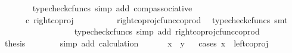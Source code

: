 \begin{isabellebody}
\ \ \ \ \ \ \isamarkupfalse%
\ {\isacharparenleft}{\kern0pt}typecheck{\isacharunderscore}{\kern0pt}cfuncs{\isacharcomma}{\kern0pt}\ simp\ add{\isacharcolon}{\kern0pt}\ comp{\isacharunderscore}{\kern0pt}associative{}{\isacharparenright}{\kern0pt}\isanewline
\ \ \ \ \isamarkupfalse%
\ \isamarkupfalse%
\ {\isachardoublequoteopen}{\isachardot}{\kern0pt}{\isachardot}{\kern0pt}{\isachardot}{\kern0pt}\ {\isacharequal}{\kern0pt}\ {\isasymlangle}{\isasymt}{\isacharcomma}{\kern0pt}{\isasymf}{\isasymrangle}\ {\isasymamalg}\ {\isasymlangle}{\isasymf}{\isacharcomma}{\kern0pt}{\isasymt}{\isasymrangle}\ {\isasymcirc}\isactrlsub c\ right{\isacharunderscore}{\kern0pt}coproj\ {\isasymone}\ {\isasymone}{\isachardoublequoteclose}\isanewline
\ \ \ \ \ \ \isamarkupfalse%
\ right{\isacharunderscore}{\kern0pt}coproj{\isacharunderscore}{\kern0pt}cfunc{\isacharunderscore}{\kern0pt}coprod\ \isamarkupfalse%
\ {\isacharparenleft}{\kern0pt}typecheck{\isacharunderscore}{\kern0pt}cfuncs{\isacharcomma}{\kern0pt}\ smt{\isacharparenright}{\kern0pt}\isanewline
\ \ \ \ \isamarkupfalse%
\ \isamarkupfalse%
\ {\isachardoublequoteopen}{\isachardot}{\kern0pt}{\isachardot}{\kern0pt}{\isachardot}{\kern0pt}\ {\isacharequal}{\kern0pt}\ {\isasymlangle}{\isasymf}{\isacharcomma}{\kern0pt}{\isasymt}{\isasymrangle}{\isachardoublequoteclose}\isanewline
\ \ \ \ \ \ \isamarkupfalse%
\ {\isacharparenleft}{\kern0pt}typecheck{\isacharunderscore}{\kern0pt}cfuncs{\isacharcomma}{\kern0pt}\ simp\ add{\isacharcolon}{\kern0pt}\ right{\isacharunderscore}{\kern0pt}coproj{\isacharunderscore}{\kern0pt}cfunc{\isacharunderscore}{\kern0pt}coprod{\isacharparenright}{\kern0pt}\isanewline
\ \ \ \ \isamarkupfalse%
\ \isamarkupfalse%
\ {\isacharquery}{\kern0pt}thesis\isanewline
\ \ \ \ \ \ \isamarkupfalse%
\ {\isacharparenleft}{\kern0pt}simp\ add{\isacharcolon}{\kern0pt}\ calculation{\isacharparenright}{\kern0pt}\isanewline
\ \ \isamarkupfalse%
\isanewline
\ \ \isamarkupfalse%
\ {\isachardoublequoteopen}x\ {\isacharequal}{\kern0pt}\ y{\isachardoublequoteclose}\isanewline
\ \ \isamarkupfalse%
{\isacharparenleft}{\kern0pt}cases\ {\isachardoublequoteopen}x\ {\isacharequal}{\kern0pt}\ left{\isacharunderscore}{\kern0pt}coproj\ {\isasymone}\ {\isacharparenleft}{\kern0pt}{\isasymone}\ {\isasymCoprod}\ {\isasymone}{\isacharparenright}{\kern0pt}{\isachardoublequoteclose}{\isacharparenright}{\kern0pt}\isanewline

\end{isabellebody}
